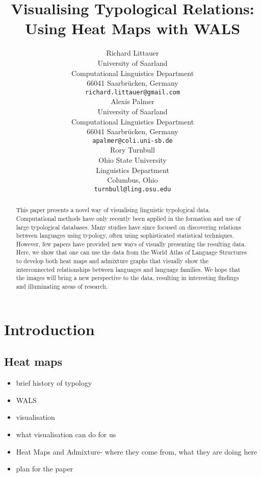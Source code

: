 \documentclass[11pt]{article}
\title{Visualising Typological Relations: Using Heat Maps with WALS}
\author{Richard Littauer \\
University of Saarland\\
Computational Linguistics Department\\
66041 Saarbr\"ucken, Germany\\
  {\tt richard.littauer@gmail.com} \\\And
Alexis Palmer\\
University of Saarland\\
Computational Linguistics Department\\
66041 Saarbr\"ucken, Germany\\
  {\tt apalmer@coli.uni-sb.de} \\\And
Rory Turnbull \\
Ohio State University\\
Linguistics Department\\
Columbus, Ohio\\
  {\tt turnbull@ling.osu.edu} \\}
\date{}
\begin{document}
\maketitle
\begin{abstract}
This paper presents a novel way of visualising linguistic typological data. Computational methods have only recently been applied in the formation and use of large typological databases. Many studies have since focused on discovering relations between languages using typology, often using sophisticated statistical techniques. However, few papers have provided new ways of visually presenting the resulting data. Here, we show that one can use the data from the World Atlas of Language Structures\cite{wals-2011} to develop both heat maps and admixture graphs that visually show the interconnected relationships between languages and language families. We hope that the images will bring a new perspective to the data, resulting in interesting findings and illuminating areas of research.
\end{abstract}


\section{Introduction}
\subsection{Heat maps}
\begin{itemize}
\item brief history of typology
\item WALS
\item visualisation
\item what visualisation can do for us
\item Heat Maps and Admixture-  where they come from, what they are doing here
\item plan for the paper
\end{itemize}


%
%
%
%
%
%
%
\end{document}
